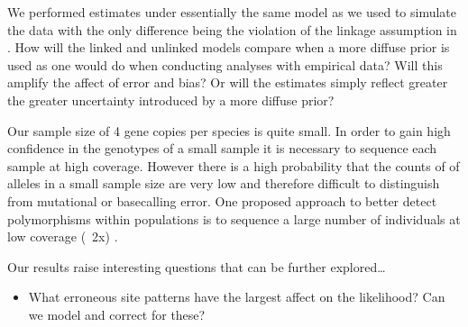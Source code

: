 We performed estimates under essentially the same model as we used to simulate 
the data with the only difference being the violation of the linkage assumption 
in \ecoevolity. 
How will the linked and unlinked models compare when a more diffuse prior is 
used as one would do when conducting analyses with empirical data?
Will this amplify the affect of error and bias? Or will the estimates simply
reflect greater the greater uncertainty introduced by a more diffuse prior?   

Our sample size of 4 gene copies per species is quite small. In order to gain high confidence
in the genotypes of a small sample it is necessary to sequence each sample at 
high coverage. However there is a high probability that the counts of of alleles 
in a small sample size are very low and therefore difficult to distinguish from
mutational or basecalling error. One proposed approach to better detect polymorphisms 
within populations is to sequence a large number of individuals at low coverage
(~2x) \citep{alexbuerklePopulationGenomicsBased2013}.



Our results raise interesting questions that can be further explored\ldots
\begin{itemize}
    \item What erroneous site patterns have the largest affect on
        the likelihood? Can we model and correct for these?
\end{itemize}
